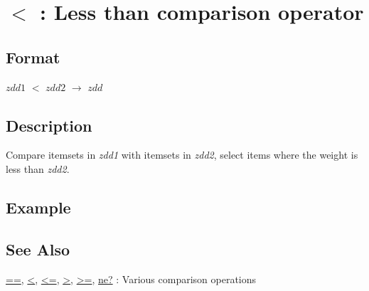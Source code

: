 
\section{$<$ : Less than comparison operator\label{sect:lt}}
\subsection*{Format}

$zdd1$ $<$ $zdd2$ $\rightarrow$ $zdd$

\subsection*{Description}
Compare itemsets in \emph{zdd1} with itemsets in \emph{zdd2}, select items where the weight is less than \emph{zdd2}. 


\subsection*{Example}


\subsection*{See Also}
\hyperref[sect:eq]{==},
\hyperref[sect:lt]{<},
\hyperref[sect:le]{<=},
\hyperref[sect:gt]{>},
\hyperref[sect:ge]{>=},
\hyperref[sect:ne]{ne?} : Various comparison operations

